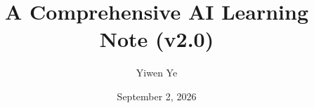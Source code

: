 
\title{A Comprehensive AI Learning Note (v2.0)}
\author{Yiwen Ye}
\date{September 2, 2026}


\makeatletter
\begin{titlepage}
\centering
\vspace*{0.18\textheight}
{\color{latexprojectBlue}\resizebox{0.92\textwidth}{!}{\bfseries\@title}\par}
\vspace{2.2em}
{\Large\@author\par}
\vfill
{\large\@date\par}
\end{titlepage}
\makeatother
\frontmatter
{}
{}
\tableofcontents


